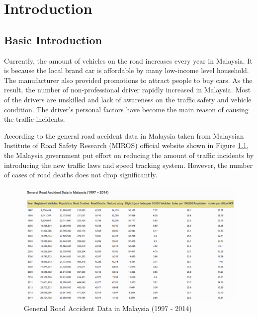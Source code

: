\chapter{Introduction}
\section{Basic Introduction}
Currently, the amount of vehicles on the road increases every year in Malaysia. It is because the local brand car is affordable by many low-income level household. The manufacturer also provided promotions to attract people to buy cars. As the result, the number of non-professional driver rapidly increased in Malaysia. Most of the drivers are unskilled and lack of awareness on the traffic safety and vehicle condition. The driver's personal factors have become the main reason of causing the traffic incidents.

According to the general road accident data in Malaysia taken from Malaysian Institute of Road Safety Research (MIROS) official website shown in Figure \ref{fig:accident}, the Malaysia government put effort on reducing the amount of traffic incidents by introducing the new traffic laws and speed tracking system. However, the number of cases of road deaths does not drop significantly.

\begin{figure}[hbt!]\centering
\includegraphics[width=.75\textwidth]{image/accident}
\caption{General Road Accident Data in Malaysia (1997 - 2014)}
\label{fig:accident}
\end{figure}

